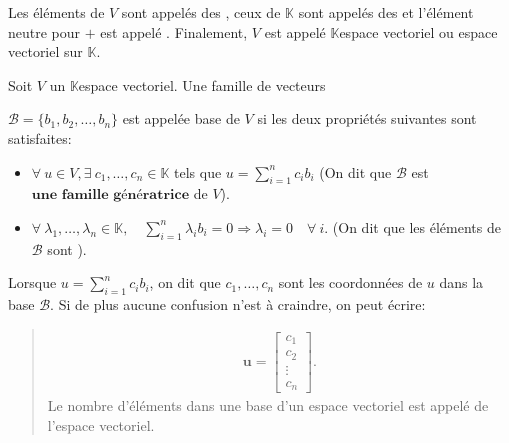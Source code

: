 \documentclass[letterpaper,11pt,english]{sphinxmanual}
\begin{document}
\begin{DUlineblock}{0em}
\item[]  Les éléments de \(V\) sont appelés des
, ceux de \(\mathbb{K}\) sont appelés des
 et l’élément neutre pour \(+\) est appelé . Finalement, \(V\) est appelé \(\mathbb{K}\)\sphinxhyphen{}espace
vectoriel ou espace vectoriel sur \(\mathbb{K}\).
\item[]  Soit \(V\) un
\(\mathbb{K}\)\sphinxhyphen{}espace vectoriel. Une famille de vecteurs
\item[] \(\mathcal{B}=\big\{b_1, b_2, \dots, b_n\big\}\) est appelée base
de \(V\) si les deux propriétés suivantes sont satisfaites:
\end{DUlineblock}
\begin{itemize}
\item {} 
\sphinxAtStartPar
\(\forall\  u \in V, \exists~ c_1, \dots, c_n \in \mathbb{K}\)
tels que \(\displaystyle u = \sum_{i=1}^{n}c_i b_i\)
(On dit que \(\mathcal{B}\) est
\(\textbf{une famille génératrice}\) de \(V\)).

\item {} 
\sphinxAtStartPar
\(\displaystyle \forall\  \lambda_1, \dots, \lambda_n \in \mathbb{K}, \quad\sum_{i=1}^{n}\lambda_i b_i=0\Longrightarrow \lambda_i = 0 \quad\forall\  i\).
(On dit que les éléments de \(\mathcal{B}\) sont ).

\end{itemize}

\begin{DUlineblock}{0em}
\item[] Lorsque \(\displaystyle u = \sum_{i=1}^{n}c_i b_i\), on dit que
\(c_1, \dots, c_n\) sont les coordonnées de \(u\) dans la base
\(\mathcal{B}\). Si de plus aucune confusion n’est à craindre, on
peut écrire:
\end{DUlineblock}
\begin{quote}
\begin{equation}\label{equation:chapter2:chapter2:1}
\begin{split}\mathbf{u}=\begin{bmatrix}
c_1\\c_2\\ \vdots\\ c_n
\end{bmatrix}.\end{split}
\end{equation}
\sphinxAtStartPar
{} Le nombre d’éléments dans une base d’un espace
vectoriel est appelé  de l’espace vectoriel.
\end{quote}
\end{document}
